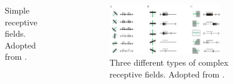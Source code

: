 \documentclass[a4paper,9pt]{beamer}
\theoremstyle{mytheoremstyle}
\begin{document}
\begin{frame}
\begin{columns}
\begin{figure}
\begin{center}
\end{center}
	\caption{Simple receptive fields. Adopted from \parencite{hubel1962}.}
\end{figure}
\vspace{0.2cm}
\begin{figure}
\begin{center}
  \includegraphics[width=0.75\textwidth]{res/complex_cells.png}
\end{center}
	\caption{Three different types of complex receptive fields. Adopted from \parencite{hubel1962}.}
\end{figure}
\end{columns}
\end{frame}
\end{document}
